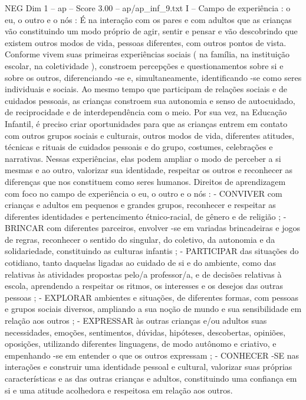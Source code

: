 \begin{textsample}{NEG Dim 1 – ap – Score 3.00 – ap/ap\_inf\_9.txt}  \label{ex:f1_neg_123}
I – Campo de experiência : o eu, o outro e o nós : É na interação com os pares e com adultos que as crianças vão constituindo um modo próprio de agir, sentir e pensar e vão descobrindo que existem outros modos de vida, pessoas diferentes, com outros pontos de vista.
Conforme vivem suas primeiras experiências sociais ( na família, na instituição escolar, na coletividade ), constroem percepções e questionamentos sobre si e sobre os outros, diferenciando -se e, simultaneamente, identificando -se como seres individuais e sociais.
Ao mesmo tempo que participam de relações sociais e de cuidados pessoais, as crianças constroem sua autonomia e senso de autocuidado, de reciprocidade e de interdependência com o meio.
Por sua vez, na Educação Infantil, é preciso criar oportunidades para que as crianças entrem em contato com outros grupos sociais e culturais, outros modos de vida, diferentes atitudes, técnicas e rituais de cuidados pessoais e do grupo, costumes, celebrações e narrativas.
Nessas experiências, elas podem ampliar o modo de perceber a si mesmas e ao outro, valorizar sua identidade, respeitar os outros e reconhecer as diferenças que nos constituem como seres humanos.
Direitos de aprendizagem com foco no campo de experiência o eu, o outro e o nós : - CONVIVER com crianças e adultos em pequenos e grandes grupos, reconhecer e respeitar as diferentes identidades e pertencimento étnico-racial, de gênero e de religião ; - BRINCAR com diferentes parceiros, envolver -se em variadas brincadeiras e jogos de regras, reconhecer o sentido do singular, do coletivo, da autonomia e da solidariedade, constituindo as culturas infantis ; - PARTICIPAR das situações do cotidiano, tanto daquelas ligadas ao cuidado de si e do ambiente, como das relativas às atividades propostas pelo/a professor/a, e de decisões relativas à escola, aprendendo a respeitar os ritmos, os interesses e os desejos das outras pessoas ; - EXPLORAR ambientes e situações, de diferentes formas, com pessoas e grupos sociais diversos, ampliando a sua noção de mundo e sua sensibilidade em relação aos outros ; - EXPRESSAR às outras crianças e/ou adultos suas necessidades, emoções, sentimentos, dúvidas, hipóteses, descobertas, opiniões, oposições, utilizando diferentes linguagens, de modo autônomo e criativo, e empenhando -se em entender o que os outros expressam ; - CONHECER -SE nas interações e construir uma identidade pessoal e cultural, valorizar suas próprias características e as das outras crianças e adultos, constituindo uma confiança em si e uma atitude acolhedora e respeitosa em relação aos outros.

\end{textsample}
